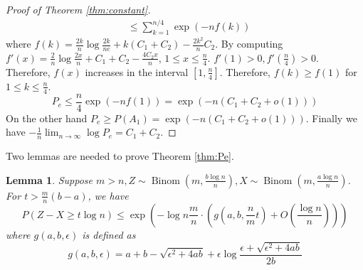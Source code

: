 \documentclass[conference]{IEEEtran}
\newtheorem{lemma}{Lemma}
\DeclareMathOperator{\Binom}{Binom}
\begin{document}
\begin{proof}[Proof of Theorem \ref{thm:constant}]
\begin{align*}
& \leq \sum_{k=1}^{n/4} \exp(-nf(k))
\end{align*}
where $f(k) = \frac{2k}{n}\log \frac{2k}{ne} + k(C_1+C_2) - \frac{2k^2}{n}C_2$.
By computing $f'(x)= \frac{2}{n} \log \frac{2x}{n} + C_1+C_2 - \frac{4C_2x}{n}$, $1\leq x \leq \frac{n}{4}$.
$f'(1) > 0 , f'(\frac{n}{4}) > 0$. Therefore, $f(x)$ increases in the interval $[1, \frac{n}{4}]$.
Therefore, $f(k) \geq f(1)$ for $1\leq k \leq \frac{n}{4}$.
\begin{equation}
P_e \leq \frac{n}{4}\exp(-nf(1)) = \exp(-n (C_1+C_2+o(1)))
\end{equation}
On the other hand $P_e \geq P(A_1) = \exp(-n(C_1+C_2+o(1)))$.
Finally we have $-\frac{1}{n} \lim_{n \to \infty} \log P_e = C_1+C_2$.
\end{proof}
Two lemmas are needed to prove Theorem \ref{thm:Pe}.
\begin{lemma}\label{lem:zxt}
	Suppose $m > n, Z \sim \Binom(m, \frac{b\log n}{n}), X\sim \Binom(m, \frac{a\log n}{n})$.
	For $ t > \frac{m}{n}(b - a)$, we have
	\begin{equation}\label{eq:estimation}
	P(Z - X \geq t \log n) \leq \exp(-\log n \frac{m}{n}\cdot ( g(a, b, \frac{n}{m}t) + O(\frac{\log n}{n})))
	\end{equation}
	where $g(a,b,\epsilon)$ is defined as
	\begin{equation}\label{eq:gab}
	g(a,b,\epsilon) = a + b - \sqrt{\epsilon^2 + 4ab} + \epsilon \log \frac{\epsilon + \sqrt{\epsilon^2 + 4ab}}{2b}
	\end{equation}
\end{lemma}
\end{document}
